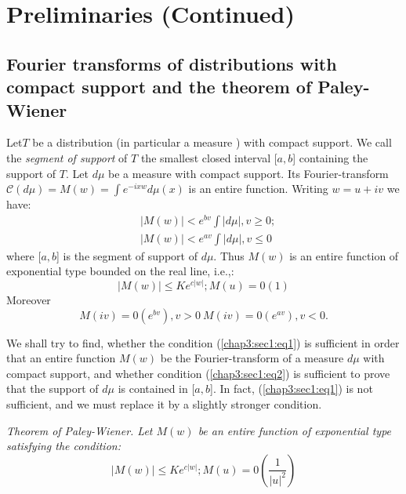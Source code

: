 \chapter{Preliminaries (Continued)}\label{chap3}

\section[Fourier transforms of distributions with...]{Fourier transforms of distributions with compact support and
 the theorem of Paley-Wiener}\label{chap3:sec1}%

Let\pageoriginale $T$ be a distribution (in particular a measure ) with compact
support. We call the \textit{segment of support} of $T$ the smallest
closed interval [$a, b$] containing the support of $T$. Let $ d \mu$ be
a measure with compact support. Its Fourier-transform $\mathscr{C} (d
\mu) = M(w) = \int e^{-ixw} d \mu (x)$ is an entire function. Writing
$w = u + iv$ we have: 
\begin{align*}
 &\Big| M(w) \Big| < e^{bv} \int \Big| d \mu \Big|, v \geq 0;\\
 &\Big| M(w) \Big| < e^{av} \int \Big| d \mu \Big|, v \leq 0
\end{align*}
where [$a, b$] is the segment of support of $d \mu$. Thus $M(w)$ is an
entire function of exponential type bounded on the real line, i.e.,: 
\begin{equation*}
 \Big| M(w) \Big| \leq K e^{c|w|}; M(u) = 0(1) \tag{1}\label{chap3:sec1:eq1}
\end{equation*}
Moreover 
\begin{equation*}
 M(iv) = 0 (e^{bv}), v > 0 ~M(iv) = 0 (e^{av}), v < 0. \tag{2}\label{chap3:sec1:eq2}
\end{equation*}

We shall try to find, whether the condition (\ref{chap3:sec1:eq1}) is sufficient in
order that an entire function $M(w)$ be the Fourier-transform of a
measure $d \mu$ with compact support, and whether condition (\ref{chap3:sec1:eq2}) is
sufficient to prove that the support of $d \mu$ is contained in [$a,
 b$]. In fact, (\ref{chap3:sec1:eq1}) is not sufficient, and we must replace it by a
slightly stronger condition. 

\textit{Theorem of Paley-Wiener. Let $M(w)$ be an entire function of
 exponential type satisfying the condition:} 
\begin{equation*}
 \Big| M(w) \Big| \leq K e^{c | w |} ; M(u) = 0
 \left(\frac{1}{|u|^2}\right) \tag{$1'$} 
\end{equation*}

